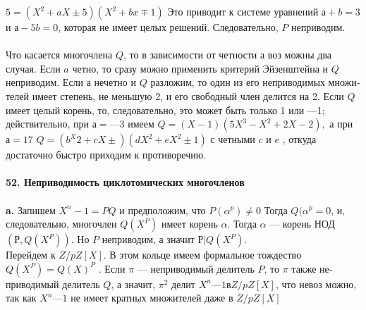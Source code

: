 $5 = (X^{2} + aX \pm 5)(X^{2} + bx \mp 1)$ Это приводит к системе уравнений \linebreak
$а + b = 3$ и $а - 5b = 0$, которая не имеет целых решений. Следовательно,\linebreak
$P$ неприводим.\\
\\
\hspace*{15pt} Что касается многочлена $Q$, то в зависимости от четности а воз­
можны два случая. Если $a$ четно, то сразу можно применить критерий
Эйзенштейна и $Q$ неприводим.
\hspace*{0pt} Если а нечетно и $Q$ разложим, то один из его неприводимых множи­\linebreak
телей имеет степень, не меньшую 2, и его свободный член делится на 2.\linebreak
Если $Q$ имеет целый корень, то, следовательно, это может быть только 1\linebreak
или —1; действительно, при $а = —3$ имеем $Q = (X - 1)(5X^3 - X^2 + 2X - 2),$\linebreak
а при $а = 17$ $Q = (b^X{2} + cX \pm)(dX^{2} + eX^{2} \pm 1)$ с четными $c$ и $e$ , откуда\linebreak
достаточно быстро приходим к противоречию.\\
\\
\noindent\textbf{52. Неприводимость циклотомических многочленов}\\
\\
\hspace*{15pt}\textbf{a.} Запишем $X^{n} - 1 = PQ $ и предположим, что $P(\alpha^p) \neq 0$ Тогда\linebreak
$Q(\alpha^{p} = 0$, и, следовательно, многочлен $Q(X^{P})$ имеет корень $\alpha$. Тогда\linebreak
$\alpha$ ---  корень НОД$(Р, Q(X^{P}))$. Но $P$ неприводим, а значит $Р | Q(X^{P})$.\\
\hspace*{0pt}Перейдем к $Z/pZ[X]$. В этом кольце имеем формальное тождество\linebreak
$Q(X^{P}) = Q(X)^{P}$ . Если $\pi$ --- неприводимый делитель $P$, то $\pi$ также не­\linebreak
приводимый делитель $Q$, а значит, $\pi^{2}$ делит $X^{n} — 1 в Z/pZ[X]$, что невоз­\linebreak
можно, так как $X^{n} — 1$ не имеет кратных множителей даже в $Z/pZ[X]$\\
\newpage

